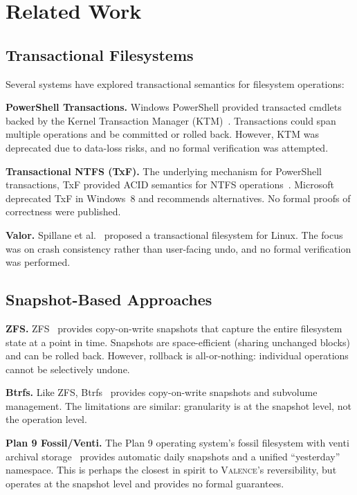 \documentclass[11pt,a4paper]{article}
\newcommand{\valence}{\textsc{Valence}}
\begin{document}
\section{Related Work}
\label{sec:related}

\subsection{Transactional Filesystems}

Several systems have explored transactional semantics for filesystem operations:

\textbf{PowerShell Transactions.} Windows PowerShell provided transacted
cmdlets backed by the Kernel Transaction Manager
(KTM)~\citep{powershell-transactions}. Transactions could span multiple
operations and be committed or rolled back. However, KTM was deprecated due
to data-loss risks, and no formal verification was
attempted.

\textbf{Transactional NTFS (TxF).} The underlying mechanism for PowerShell
transactions, TxF provided ACID semantics for NTFS
operations~\citep{microsoft-txf}. Microsoft deprecated TxF in Windows~8 and
recommends alternatives. No formal proofs of correctness were published.

\textbf{Valor.} Spillane et al.~\citep{spillane2009} proposed a
transactional filesystem for Linux. The focus was on crash consistency rather
than user-facing undo, and no formal verification was performed.

\subsection{Snapshot-Based Approaches}

\textbf{ZFS.} ZFS~\citep{zfs} provides copy-on-write snapshots that capture
the entire filesystem state at a point in time. Snapshots are
space-efficient (sharing unchanged blocks) and can be rolled back. However,
rollback is all-or-nothing: individual operations cannot be selectively undone.

\textbf{Btrfs.} Like ZFS, Btrfs~\citep{btrfs} provides copy-on-write
snapshots and subvolume management. The limitations are similar: granularity
is at the snapshot level, not the operation level.

\textbf{Plan 9 Fossil/Venti.} The Plan 9 operating system's fossil filesystem
with venti archival storage~\citep{plan9fossil} provides automatic daily
snapshots and a unified ``yesterday'' namespace. This is perhaps the closest
in spirit to \valence{}'s reversibility, but operates at the snapshot level
and provides no formal guarantees.
\end{document}
